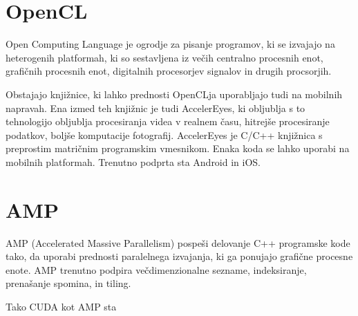 \section{OpenCL}

Open Computing Language je ogrodje za pisanje programov, ki se izvajajo na heterogenih platformah, ki so sestavljena iz večih centralno procesnih enot, grafičnih procesnih enot, digitalnih procesorjev signalov in drugih procsorjih.

Obstajajo knjižnice, ki lahko prednosti OpenCLja uporabljajo tudi na mobilnih napravah. Ena izmed teh knjižnic je tudi AccelerEyes, ki obljublja s to tehnologijo obljublja procesiranja videa v realnem času, hitrejše procesiranje podatkov, boljše komputacije fotografij. AccelerEyes je C/C++ knjižnica s preprostim matričnim programskim vmesnikom. Enaka koda se lahko uporabi na mobilnih platformah. Trenutno podprta sta Android in iOS.

\section{AMP}

AMP (Accelerated Massive Parallelism) pospeši delovanje C++ programske kode tako, da uporabi prednosti paralelnega izvajanja, ki ga ponujajo grafične procesne enote. AMP trenutno podpira večdimenzionalne sezname, indeksiranje, prenašanje spomina, in tiling.

Tako CUDA kot AMP sta 